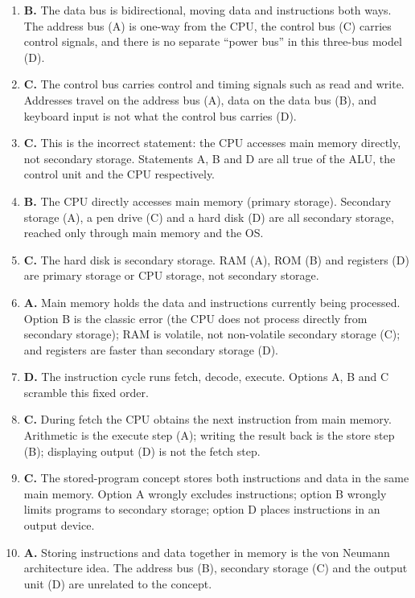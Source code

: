 \begin{enumerate}[label=\textbf{Q\arabic*.}, leftmargin=*]
  the control bus (C), and power is supplied separately (D), not over the
  address bus.
\item \textbf{B.} The data bus is bidirectional, moving data and instructions
  both ways. The address bus (A) is one-way from the CPU, the control bus (C)
  carries control signals, and there is no separate ``power bus'' in this
  three-bus model (D).
\item \textbf{C.} The control bus carries control and timing signals such as
  read and write. Addresses travel on the address bus (A), data on the data
  bus (B), and keyboard input is not what the control bus carries (D).
\item \textbf{C.} This is the incorrect statement: the CPU accesses main
  memory directly, not secondary storage. Statements A, B and D are all true
  of the ALU, the control unit and the CPU respectively.
\item \textbf{B.} The CPU directly accesses main memory (primary storage).
  Secondary storage (A), a pen drive (C) and a hard disk (D) are all
  secondary storage, reached only through main memory and the OS.
\item \textbf{C.} The hard disk is secondary storage. RAM (A), ROM (B) and
  registers (D) are primary storage or CPU storage, not secondary storage.
\item \textbf{A.} Main memory holds the data and instructions currently being
  processed. Option B is the classic error (the CPU does not process directly
  from secondary storage); RAM is volatile, not non-volatile secondary storage
  (C); and registers are faster than secondary storage (D).
\item \textbf{D.} The instruction cycle runs fetch, decode, execute. Options
  A, B and C scramble this fixed order.
\item \textbf{C.} During fetch the CPU obtains the next instruction from main
  memory. Arithmetic is the execute step (A); writing the result back is the
  store step (B); displaying output (D) is not the fetch step.
\item \textbf{C.} The stored-program concept stores both instructions and data
  in the same main memory. Option A wrongly excludes instructions; option B
  wrongly limits programs to secondary storage; option D places instructions
  in an output device.
\item \textbf{A.} Storing instructions and data together in memory is the von
  Neumann architecture idea. The address bus (B), secondary storage (C) and
  the output unit (D) are unrelated to the concept.

\end{enumerate}
